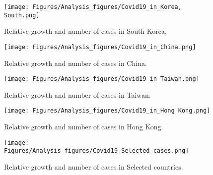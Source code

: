 \begin{figure}
    \centering
    \texttt{[image: Figures/Analysis\_figures/Covid19\_in\_Korea, South.png]}
    \caption{Relative growth and number of cases in South Korea.}\label{fig:SouthKorea}
\end{figure}

\begin{figure}
    \centering
    \texttt{[image: Figures/Analysis\_figures/Covid19\_in\_China.png]}
    \caption{Relative growth and number of cases in China.}\label{fig:China}
\end{figure}

\begin{figure}
    \centering
    \texttt{[image: Figures/Analysis\_figures/Covid19\_in\_Taiwan.png]}
    \caption{Relative growth and number of cases in Taiwan.}\label{fig:Taiwan}
\end{figure}

\begin{figure}
    \centering
    \texttt{[image: Figures/Analysis\_figures/Covid19\_in\_Hong Kong.png]}
    \caption{Relative growth and number of cases in Hong
    Kong.}\label{fig:HongKong}
\end{figure}

\begin{figure}
    \centering
    \texttt{[image: Figures/Analysis\_figures/Covid19\_Selected\_cases.png]}
    \caption{Relative growth and number of cases in Selected countries.}\label{fig:Selected}
\end{figure}
